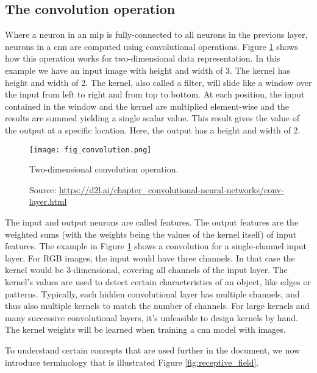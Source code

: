 \subsection{The convolution operation}
Where a neuron in an \acrshort{mlp} is fully-connected to all neurons in the previous layer, neurons in a \acrshort{cnn} are computed using convolutional operations. Figure \ref{fig:convolution} shows how this operation works for two-dimensional data representation. In this example we have an input image with height and width of 3. The kernel has height and width of 2. The kernel, also called a filter, will slide like a window over the input from left to right and from top to bottom. At each position, the input contained in the window and the kernel are multiplied element-wise and the results are summed yielding a single scalar value. This result gives the value of the output at a specific location. Here, the output has a height and width of 2.
\begin{figure}[ht]
    \begin{center}       
    \texttt{[image: fig\_convolution.png]}
    \caption[Two-dimensional convolution operation]{Two-dimensional convolution operation.}
    \caption*{Source: \href{https://d2l.ai/chapter\_convolutional-neural-networks/conv-layer.html}{https://d2l.ai/chapter\_convolutional-neural-networks/conv-layer.html}}
    \label{fig:convolution}
    \end{center}
\end{figure}

The input and output neurons are called features. The output features are the weighted sums (with the weights being the values of the kernel itself) of input features. The example in Figure \ref{fig:convolution} shows a convolution for a single-channel input layer. For RGB images, the input would have three channels. In that case the kernel would be 3-dimensional, covering all channels of the input layer. The kernel's values are used to detect certain characteristics of an object, like edges or patterns. Typically, each hidden convolutional layer has multiple channels, and thus also multiple kernels to match the number of channels. For large kernels and many successive convolutional layers, it's unfeasible to design kernels by hand. The kernel weights will be learned when training a \acrshort{cnn} model with images.

To understand certain concepts that are used further in the document, we now introduce terminology that is illustrated Figure \ref{fig:receptive_field}.

